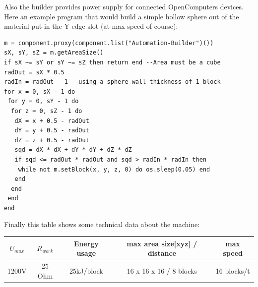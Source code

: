 \documentclass[11pt]{article} %
\begin{document}
Also the builder provides power supply for connected OpenComputers devices.\\

Here an example program that would build a simple hollow sphere out of the material put in the Y-edge slot (at max speed of course):
\begin{lstlisting}
m = component.proxy(component.list("Automation-Builder")())
sX, sY, sZ = m.getAreaSize()
if sX ~= sY or sY ~= sZ then return end --Area must be a cube
radOut = sX * 0.5
radIn = radOut - 1 --using a sphere wall thickness of 1 block 
for x = 0, sX - 1 do
 for y = 0, sY - 1 do
  for z = 0, sZ - 1 do
   dX = x + 0.5 - radOut
   dY = y + 0.5 - radOut
   dZ = z + 0.5 - radOut
   sqd = dX * dX + dY * dY + dZ * dZ
   if sqd <= radOut * radOut and sqd > radIn * radIn then
    while not m.setBlock(x, y, z, 0) do os.sleep(0.05) end
   end
  end
 end
end
\end{lstlisting}
Finally this table shows some technical data about the machine: \\
\begin{tabular}{| c | c | c | c | c |} \hline
\bf $U_{max}$ & \bf $R_{work}$ & \bf Energy usage & \bf max area size[xyz] / distance & \bf max speed \\ \hline
1200V & 25 Ohm & 25kJ/block & 16 x 16 x 16 / 8 blocks & 16 blocks/t \\ \hline
\end{tabular} \\
\end{document}
